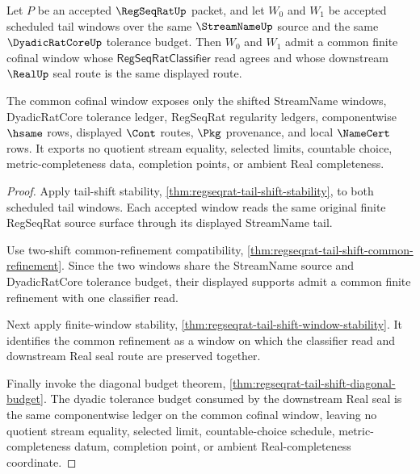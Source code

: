 \begin{theorem}
\label{thm:regseqrat-tail-window-cofinality}
Let $P$ be an accepted $\RegSeqRatUp$ packet, and let $W_0$ and $W_1$ be accepted scheduled tail windows over the same $\StreamNameUp$ source and the same $\DyadicRatCoreUp$ tolerance budget. Then $W_0$ and $W_1$ admit a common finite cofinal window whose $\mathsf{RegSeqRatClassifier}$ read agrees and whose downstream $\RealUp$ seal route is the same displayed route.

The common cofinal window exposes only the shifted StreamName windows, DyadicRatCore tolerance ledger, RegSeqRat regularity ledgers, componentwise $\hsame$ rows, displayed $\Cont$ routes, $\Pkg$ provenance, and local $\NameCert$ rows. It exports no quotient stream equality, selected limits, countable choice, metric-completeness data, completion points, or ambient Real completeness.
\end{theorem}
\begin{proof}
Apply tail-shift stability, \autoref{thm:regseqrat-tail-shift-stability}, to both scheduled tail windows. Each accepted window reads the same original finite RegSeqRat source surface through its displayed StreamName tail.

Use two-shift common-refinement compatibility, \autoref{thm:regseqrat-tail-shift-common-refinement}. Since the two windows share the StreamName source and DyadicRatCore tolerance budget, their displayed supports admit a common finite refinement with one classifier read.

Next apply finite-window stability, \autoref{thm:regseqrat-tail-shift-window-stability}. It identifies the common refinement as a window on which the classifier read and downstream Real seal route are preserved together.

Finally invoke the diagonal budget theorem, \autoref{thm:regseqrat-tail-shift-diagonal-budget}. The dyadic tolerance budget consumed by the downstream Real seal is the same componentwise ledger on the common cofinal window, leaving no quotient stream equality, selected limit, countable-choice schedule, metric-completeness datum, completion point, or ambient Real-completeness coordinate.
\end{proof}

